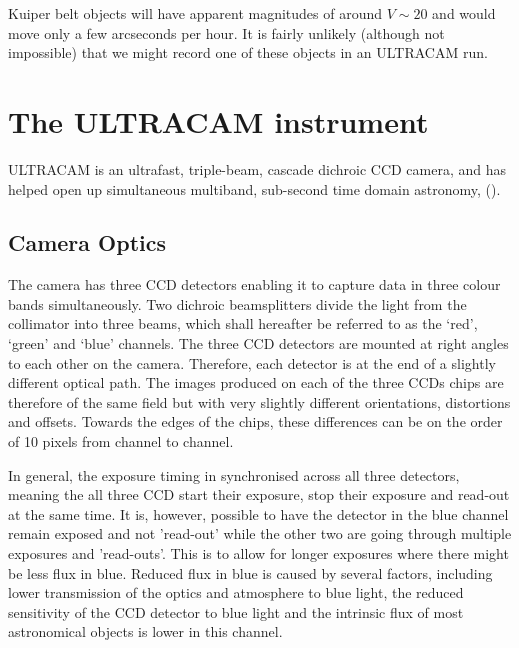 Kuiper belt objects will have apparent magnitudes of around $V\sim 20$ and would move only a few arcseconds per hour. It is fairly unlikely (although not impossible) that we might record one of these objects in an ULTRACAM run. 

\section{The ULTRACAM instrument} 
ULTRACAM is an ultrafast, triple-beam, cascade dichroic CCD camera, and has helped open up simultaneous multiband, sub-second time domain astronomy, (\cite{dhillon07}). 

\subsection{Camera Optics}

The camera has three CCD detectors enabling it to capture data in three colour bands simultaneously. Two dichroic beamsplitters divide the light from the collimator into three beams, which shall hereafter be referred to as the `red', `green' and `blue' channels. The three CCD detectors are mounted at right angles to each other on the camera. Therefore, each detector is at the end of a slightly different optical path. The images produced on each of the three CCDs chips are therefore of the same field but with very slightly different orientations, distortions and offsets. Towards the edges of the chips, these differences can be on the order of 10 pixels from channel to channel. 

In general, the exposure timing in synchronised across all three detectors, meaning the all three CCD start their exposure, stop their exposure and read-out at the same time. It is, however, possible to have the detector in the blue channel remain exposed and not 'read-out' while the other two are going through multiple exposures and 'read-outs'. This is to allow for longer exposures where there might be less flux in blue. Reduced flux in blue is caused by several factors, including lower transmission of the optics and atmosphere to blue light, the reduced sensitivity of the CCD detector to blue light and the intrinsic flux of most astronomical objects is lower in this channel.

